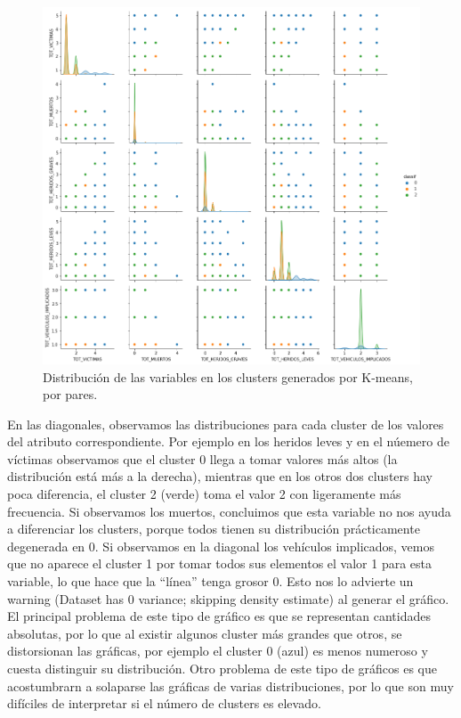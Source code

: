 \documentclass[oneside]{book}
\begin{document}
\begin{figure}[H]
  \centering
  \includegraphics[width=180mm]{figures/accidentes/k-means1pair}
  \caption{Distribución de las variables en los clusters generados por
    K-means, por pares.}
  \label{fig:k-means1pair}
\end{figure}

En las diagonales, observamos las distribuciones para cada cluster de
los valores del atributo correspondiente. Por ejemplo en los heridos
leves y en el núemero de víctimas observamos que el cluster 0 llega a
tomar valores más altos (la distribución está más a la derecha),
mientras que en los otros dos clusters hay poca diferencia, el cluster
2 (verde) toma el valor 2 con ligeramente más frecuencia. Si
observamos los muertos, concluimos que esta variable no nos ayuda a
diferenciar los clusters, porque todos tienen su distribución
prácticamente degenerada en 0. Si observamos en la diagonal los
vehículos implicados, vemos que no aparece el cluster 1 por tomar
todos sus elementos el valor 1 para esta variable, lo que hace que la
``línea'' tenga grosor 0. Esto nos lo advierte un warning (Dataset has
0 variance; skipping density estimate) al generar el gráfico. El
principal problema de este tipo de gráfico es que se representan
cantidades absolutas, por lo que al existir algunos cluster más
grandes que otros, se distorsionan las gráficas, por ejemplo el
cluster 0 (azul) es menos numeroso y cuesta distinguir su
distribución. Otro problema de este tipo de gráficos es que
acostumbrarn a solaparse las gráficas de varias distribuciones, por lo
que son muy difíciles de interpretar si el número de clusters es
elevado.
\end{document}
